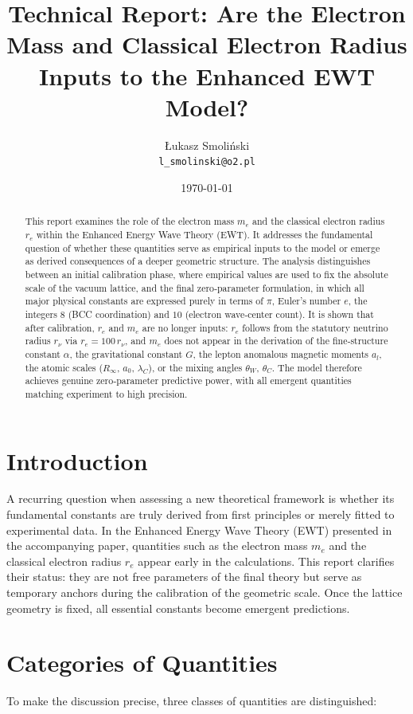 \documentclass{article}
\title{Technical Report: Are the Electron Mass and Classical Electron Radius\\[0.2em] Inputs to the Enhanced EWT Model?}
\author{Łukasz Smoliński\\[0.2em]\texttt{l\_smolinski@o2.pl}}
\date{\today}
\begin{document}
	
	\maketitle
	
	\begin{abstract}
		This report examines the role of the electron mass $m_e$ and the classical electron radius $r_e$ within the Enhanced Energy Wave Theory (EWT). It addresses the fundamental question of whether these quantities serve as empirical inputs to the model or emerge as derived consequences of a deeper geometric structure. The analysis distinguishes between an initial calibration phase, where empirical values are used to fix the absolute scale of the vacuum lattice, and the final zero‑parameter formulation, in which all major physical constants are expressed purely in terms of $\pi$, Euler's number $e$, the integers $8$ (BCC coordination) and $10$ (electron wave‑center count). It is shown that after calibration, $r_e$ and $m_e$ are no longer inputs: $r_e$ follows from the statutory neutrino radius $r_\nu$ via $r_e = 100\,r_\nu$, and $m_e$ does not appear in the derivation of the fine‑structure constant $\alpha$, the gravitational constant $G$, the lepton anomalous magnetic moments $a_l$, the atomic scales ($R_\infty$, $a_0$, $\lambda_C$), or the mixing angles $\theta_W$, $\theta_C$. The model therefore achieves genuine zero‑parameter predictive power, with all emergent quantities matching experiment to high precision.
	\end{abstract}
	
	\section{Introduction}
	A recurring question when assessing a new theoretical framework is whether its fundamental constants are truly derived from first principles or merely fitted to experimental data. In the Enhanced Energy Wave Theory (EWT) presented in the accompanying paper, quantities such as the electron mass $m_e$ and the classical electron radius $r_e$ appear early in the calculations. This report clarifies their status: they are not free parameters of the final theory but serve as temporary anchors during the calibration of the geometric scale. Once the lattice geometry is fixed, all essential constants become emergent predictions.
	
	\section{Categories of Quantities}
	To make the discussion precise, three classes of quantities are distinguished:
	
\end{document}
